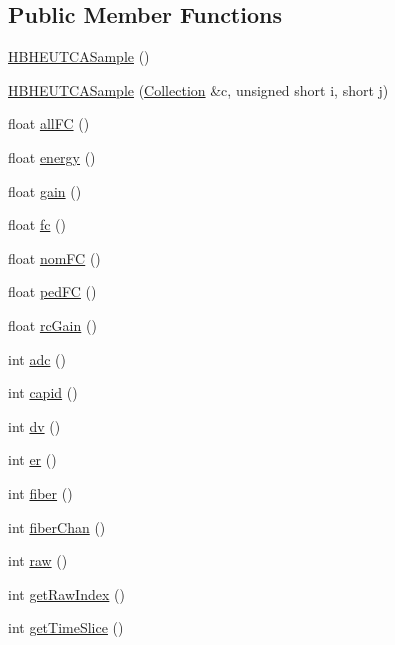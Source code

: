 \subsection*{Public Member Functions}
\begin{DoxyCompactItemize}
\item 
\hyperlink{class_h_b_h_e_u_t_c_a_sample_ae1365988bbcbe0fb5e26888abde916a8}{H\+B\+H\+E\+U\+T\+C\+A\+Sample} ()
\item 
\hyperlink{class_h_b_h_e_u_t_c_a_sample_a8bb55e8750ed42f091ef603940be01dd}{H\+B\+H\+E\+U\+T\+C\+A\+Sample} (\hyperlink{class_collection}{Collection} \&c, unsigned short i, short j)
\item 
float \hyperlink{class_h_b_h_e_u_t_c_a_sample_adc02ae534bdfa6b4deee50da12fc638d}{all\+F\+C} ()
\item 
float \hyperlink{class_h_b_h_e_u_t_c_a_sample_a16cce3e525f59c9d92dc08fb9b685852}{energy} ()
\item 
float \hyperlink{class_h_b_h_e_u_t_c_a_sample_a5c7b26e64ac924f511411024b87cb669}{gain} ()
\item 
float \hyperlink{class_h_b_h_e_u_t_c_a_sample_a5792dd730d0c9051db9c4ef9dae69c32}{fc} ()
\item 
float \hyperlink{class_h_b_h_e_u_t_c_a_sample_ae261168bd8c528c76f8ef7ded47651a6}{nom\+F\+C} ()
\item 
float \hyperlink{class_h_b_h_e_u_t_c_a_sample_a0dc80ef00077e32025a6db5fc8d3fe3b}{ped\+F\+C} ()
\item 
float \hyperlink{class_h_b_h_e_u_t_c_a_sample_a7817d78373bf3a36594ebb581a08fb4c}{rc\+Gain} ()
\item 
int \hyperlink{class_h_b_h_e_u_t_c_a_sample_a9590d80a50ee9679e283bcc1d0896ea1}{adc} ()
\item 
int \hyperlink{class_h_b_h_e_u_t_c_a_sample_aa3428923215b84025833f1f558b70993}{capid} ()
\item 
int \hyperlink{class_h_b_h_e_u_t_c_a_sample_a804ca3a58ef7f4500639fdd22622e9dd}{dv} ()
\item 
int \hyperlink{class_h_b_h_e_u_t_c_a_sample_a02c629e33022099b919fba9e69b15054}{er} ()
\item 
int \hyperlink{class_h_b_h_e_u_t_c_a_sample_a99f62813e4808dfead59ab54846ec54a}{fiber} ()
\item 
int \hyperlink{class_h_b_h_e_u_t_c_a_sample_a5f57f71833cd7650af5361b4cb2a22e2}{fiber\+Chan} ()
\item 
int \hyperlink{class_h_b_h_e_u_t_c_a_sample_aa6673645bd8dec6413065dd5d426b0b8}{raw} ()
\item 
int \hyperlink{class_h_b_h_e_u_t_c_a_sample_ac08d2b48adfec0e67cea25c3db8586d5}{get\+Raw\+Index} ()
\item 
int \hyperlink{class_h_b_h_e_u_t_c_a_sample_a4080f843b5210360e0f6aacedc26b40a}{get\+Time\+Slice} ()
\end{DoxyCompactItemize}
